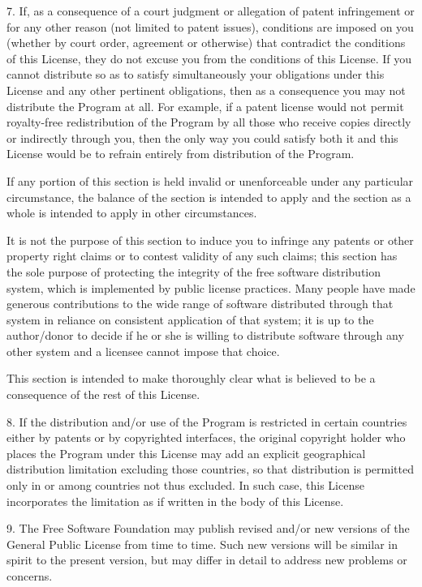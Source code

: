\documentclass{doc}
\begin{document}
  7. If, as a consequence of a court judgment or allegation of patent
infringement or for any other reason (not limited to patent issues),
conditions are imposed on you (whether by court order, agreement or
otherwise) that contradict the conditions of this License, they do not
excuse you from the conditions of this License.  If you cannot
distribute so as to satisfy simultaneously your obligations under this
License and any other pertinent obligations, then as a consequence you
may not distribute the Program at all.  For example, if a patent
license would not permit royalty-free redistribution of the Program by
all those who receive copies directly or indirectly through you, then
the only way you could satisfy both it and this License would be to
refrain entirely from distribution of the Program.

If any portion of this section is held invalid or unenforceable under
any particular circumstance, the balance of the section is intended to
apply and the section as a whole is intended to apply in other
circumstances.

It is not the purpose of this section to induce you to infringe any
patents or other property right claims or to contest validity of any
such claims; this section has the sole purpose of protecting the
integrity of the free software distribution system, which is
implemented by public license practices.  Many people have made
generous contributions to the wide range of software distributed
through that system in reliance on consistent application of that
system; it is up to the author/donor to decide if he or she is willing
to distribute software through any other system and a licensee cannot
impose that choice.

This section is intended to make thoroughly clear what is believed to
be a consequence of the rest of this License.

  8. If the distribution and/or use of the Program is restricted in
certain countries either by patents or by copyrighted interfaces, the
original copyright holder who places the Program under this License
may add an explicit geographical distribution limitation excluding
those countries, so that distribution is permitted only in or among
countries not thus excluded.  In such case, this License incorporates
the limitation as if written in the body of this License.

  9. The Free Software Foundation may publish revised and/or new versions
of the General Public License from time to time.  Such new versions will
be similar in spirit to the present version, but may differ in detail to
address new problems or concerns.
\end{document}
